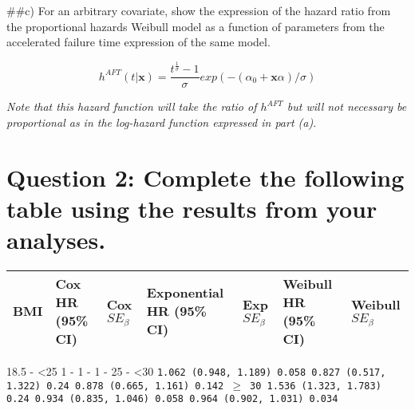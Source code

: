 \documentclass[]{article}
\begin{document}
\vspace{6pt} \#\#c) For an arbitrary covariate, show the expression of
the hazard ratio from the proportional hazards Weibull model as a
function of parameters from the accelerated failure time expression of
the same model.

\[h^{AFT}(t|\boldsymbol{x}) = \frac{t^{\frac{1}{\sigma}} - 1}{\sigma}exp(-(\alpha_0 + \boldsymbol{x}\alpha)/\sigma)\]

\emph{Note that this hazard function will take the ratio of \(h^{AFT}\)
but will not necessary be proportional as in the log-hazard function
expressed in part (a)}.

\vspace{12pt}

\section{Question 2: Complete the following table using the results from
your
analyses.}\label{question-2-complete-the-following-table-using-the-results-from-your-analyses.}

\begin{longtable}[]{@{}lllllll@{}}
\toprule
\begin{minipage}[b]{0.07\columnwidth}\raggedright\strut
BMI\strut
\end{minipage} & \begin{minipage}[b]{0.12\columnwidth}\raggedright\strut
Cox HR (95\% CI)\strut
\end{minipage} & \begin{minipage}[b]{0.12\columnwidth}\raggedright\strut
Cox \(SE_\beta\)\strut
\end{minipage} & \begin{minipage}[b]{0.12\columnwidth}\raggedright\strut
Exponential HR (95\% CI)\strut
\end{minipage} & \begin{minipage}[b]{0.12\columnwidth}\raggedright\strut
Exp \(SE_\beta\)\strut
\end{minipage} & \begin{minipage}[b]{0.12\columnwidth}\raggedright\strut
Weibull HR (95\% CI)\strut
\end{minipage} & \begin{minipage}[b]{0.12\columnwidth}\raggedright\strut
Weibull \(SE_\beta\)\strut
\end{minipage}\tabularnewline
\midrule
\endhead
\bottomrule
\end{longtable}

18.5 - \textless{}25 \textbar{} 1 \textbar{} - \textbar{} 1 \textbar{} -
\textbar{} 1 \textbar{} - 25 - \textless{}30 \textbar{} \tt{1.062}
(\tt{0.948}, \tt{1.189}) \textbar{} \tt{0.058} \textbar{} \tt{0.827}
(\tt{0.517}, \tt{1.322}) \textbar{} \tt{0.24} \textbar{} \tt{0.878}
(\tt{0.665}, \tt{1.161}) \textbar{} \tt{0.142} \(\ge\) 30 \textbar{}
\tt{1.536} (\tt{1.323}, \tt{1.783})\textbar{} \tt{0.24} \textbar{}
\tt{0.934} (\tt{0.835}, \tt{1.046}) \textbar{} \tt{0.058} \textbar{}
\tt{0.964} (\tt{0.902}, \tt{1.031}) \textbar{} \tt{0.034}
\end{document}
